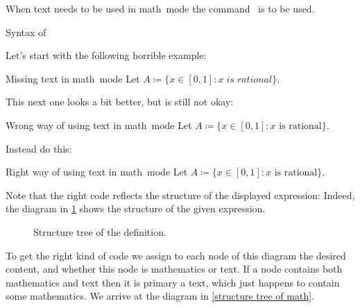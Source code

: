 When text needs to be used in math~mode the command~ is to be used.
\begin{showcode}{Syntax of }
\end{showcode}
Let’s start with the following horrible example:
\begin{showlatex}{Missing text in math~mode}
Let $A \coloneqq \{ x \in [0,1] : x \; is \; rational \}$.
\end{showlatex}
This next one looks a bit better, but is still not okay:
\begin{showlatex}[label = {wrong math mode position}]{Wrong way of using text in math~mode}
Let $A \coloneqq \{ x \in [0,1] : x \text{ is rational} \}$.
\end{showlatex}
Instead do this:
\begin{showlatex}[label = {right math mode position}]{Right way of using text in math~mode}
Let $A \coloneqq \{ x \in [0,1] : \text{$x$ is rational} \}$.
\end{showlatex}
Note that the right code reflects the structure of the displayed expression:
Indeed, the diagram in \cref{structure tree of definition} shows the structure of the given expression.
\begin{figure}[tb]
  \begin{center}
  \end{center}
  \caption{Structure tree of the definition.}
  \label{structure tree of definition}
\end{figure}
To get the right kind of code we assign to each node of this diagram the desired content, and whether this node is mathematics or text.
If a node contains both mathematics and text then it is primary a text, which just happens to contain some mathematics.
We arrive at the diagram in \cref{structure tree of math}.
